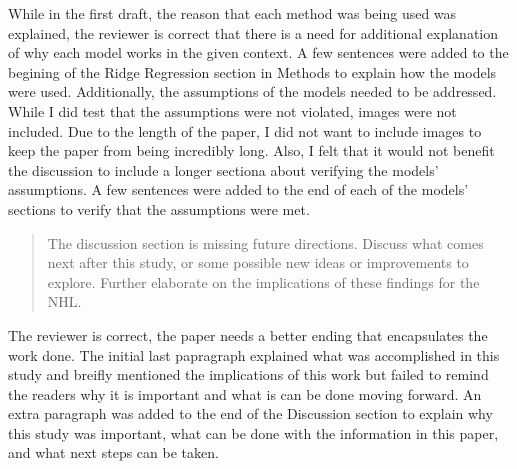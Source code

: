 \documentclass[12pt]{article}
\newenvironment{comment}%
{\begin{quotation}\noindent\small\it\ignorespaces%
  }{\end{quotation}}
\begin{document}
While in the first draft, the reason that each method was being used was explained,
the reviewer is correct that there is a need for additional explanation of why each
model works in the given context. A few sentences were added to the begining of the 
Ridge Regression section in Methods to explain how the models were used. Additionally,
the assumptions of the models needed to be addressed. While I did test that the 
assumptions were not violated, images were not included. Due to the length of the paper,
I did not want to include images to keep the paper from being incredibly long. Also, I felt
that it would not benefit the discussion to include a longer sectiona about verifying the
models' assumptions. A few sentences were added to the end of each of the models' sections 
to verify that the assumptions were met.

\begin{comment}
   The discussion section is missing future directions. Discuss what comes next after 
   this study, or some possible new ideas or improvements to explore. Further elaborate 
   on the implications of these findings for the NHL.
\end{comment}

The reviewer is correct, the paper needs a better ending that encapsulates the work 
done. The initial last papragraph explained what was accomplished in this study and
breifly mentioned the implications of this work but failed to remind the readers why
it is important and what is can be done moving forward. An extra paragraph was added 
to the end of the Discussion section to explain why this study was important, what can 
be done with the information in this paper, and what next steps can be taken.




\end{document}

